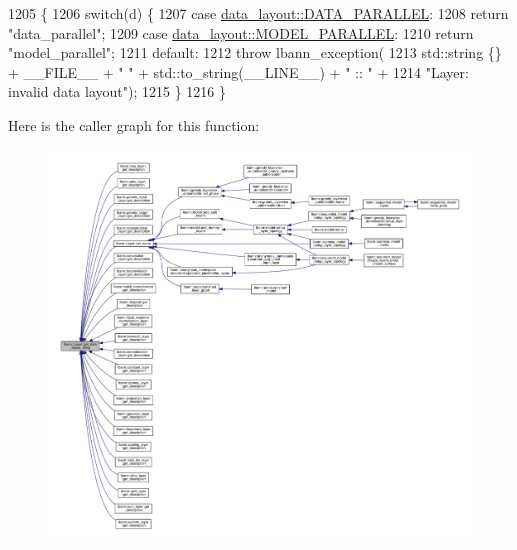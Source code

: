\begin{DoxyCode}
1205                                                            \{
1206   \textcolor{keywordflow}{switch}(d) \{
1207   \textcolor{keywordflow}{case} \hyperlink{base_8hpp_a786677cbfb3f5677b4d84f3056eb08dba37d2a3465f7cbf4ab60f4e79944d0638}{data\_layout::DATA\_PARALLEL}:
1208     \textcolor{keywordflow}{return} \textcolor{stringliteral}{"data\_parallel"};
1209   \textcolor{keywordflow}{case} \hyperlink{base_8hpp_a786677cbfb3f5677b4d84f3056eb08dbac94d7b0e44ab8bdcdad694a673cdeae0}{data\_layout::MODEL\_PARALLEL}:
1210     \textcolor{keywordflow}{return} \textcolor{stringliteral}{"model\_parallel"};
1211   \textcolor{keywordflow}{default}:
1212     \textcolor{keywordflow}{throw} lbann\_exception(
1213       std::string \{\} + \_\_FILE\_\_ + \textcolor{stringliteral}{" "} + std::to\_string(\_\_LINE\_\_) + \textcolor{stringliteral}{" :: "} +
1214       \textcolor{stringliteral}{"Layer: invalid data layout"});
1215   \}
1216 \}
\end{DoxyCode}
Here is the caller graph for this function\+:\nopagebreak
\begin{figure}[H]
\begin{center}
\leavevmode
\includegraphics[width=350pt]{classlbann_1_1Layer_ae3f4a5602df821f4221614b1e3782dc1_icgraph}
\end{center}
\end{figure}
\mbox{\label{classlbann_1_1Layer_acc0803d3428914ca1eb5988c4309174a}} 
